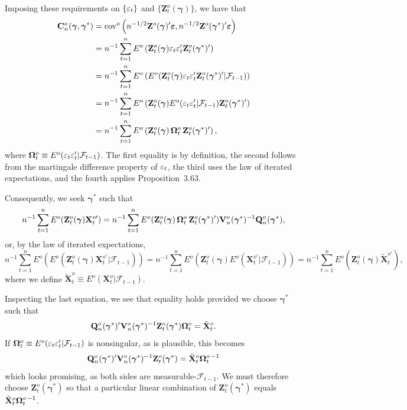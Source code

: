 Imposing these requirements on $\{\varepsilon_t\}$ and $\{\mathbf{Z}_t^o(\boldsymbol{\gamma})\}$, we have that
\begin{align*}
\mathbf{C}_n^o(\boldsymbol{\gamma}, \boldsymbol{\gamma}^*) &= \mathrm{cov}^o\left(n^{-1/2}\mathbf{Z}^o(\boldsymbol{\gamma})'\boldsymbol{\varepsilon}, n^{-1/2}\mathbf{Z}^o(\boldsymbol{\gamma}^*)'\boldsymbol{\varepsilon}\right) \\
&= n^{-1}\sum_{t=1}^{n}E^o\left(\mathbf{Z}_t^o(\boldsymbol{\gamma})\varepsilon_t\varepsilon_t'\mathbf{Z}_t^o(\boldsymbol{\gamma}^*)'\right) \\
&= n^{-1}\sum_{t=1}^{n}E^o\left(E^o(\mathbf{Z}_t^o(\boldsymbol{\gamma})\varepsilon_t\varepsilon_t'\mathbf{Z}_t^o(\boldsymbol{\gamma}^*)'|\mathcal{F}_{t-1})\right) \\
&= n^{-1}\sum_{t=1}^{n}E^o\left(\mathbf{Z}_t^o(\boldsymbol{\gamma})E^o(\varepsilon_t\varepsilon_t'|\mathcal{F}_{t-1})\mathbf{Z}_t^o(\boldsymbol{\gamma}^*)'\right) \\
&= n^{-1}\sum_{t=1}^{n}E^o\left(\mathbf{Z}_t^o(\boldsymbol{\gamma})\,\boldsymbol{\Omega}_t^o\,\mathbf{Z}_t^o(\boldsymbol{\gamma}^*)'\right),
\end{align*}
where $\boldsymbol{\Omega}_t^o \equiv E^o(\varepsilon_t\varepsilon_t'|\mathcal{F}_{t-1})$. The first equality is by definition, the second
follows from the martingale difference property of $\varepsilon_t$, the third uses the law
of iterated expectations, and the fourth applies Proposition~3.63.

Consequently, we seek $\boldsymbol{\gamma}^*$ such that
\[
n^{-1}\sum_{t=1}^{n}E^o(\mathbf{Z}_t^o(\boldsymbol{\gamma})\mathbf{X}_t^{o\prime}) = n^{-1}\sum_{t=1}^{n}E^o(\mathbf{Z}_t^o(\boldsymbol{\gamma})\,\boldsymbol{\Omega}_t^o\,\mathbf{Z}_t^o(\boldsymbol{\gamma}^*)')\mathbf{V}_n^o(\boldsymbol{\gamma}^*)^{-1}\mathbf{Q}_n^o(\boldsymbol{\gamma}^*),
\]
or, by the law of iterated expectations,
\[
n^{-1}\sum_{t=1}^{n}E^o\left(E^o\left(\mathbf{Z}_t^o(\boldsymbol{\gamma})\mathbf{X}_t^{o\prime}|\mathcal{F}_{t-1}\right)\right)
= n^{-1}\sum_{t=1}^{n}E^o\left(\mathbf{Z}_t^o(\boldsymbol{\gamma})E^o\left(\mathbf{X}_t^{o\prime}|\mathcal{F}_{t-1}\right)\right)
= n^{-1}\sum_{t=1}^{n}E^o\left(\mathbf{Z}_t^o(\boldsymbol{\gamma})\tilde{\mathbf{X}}_t^{o\prime}\right),
\]
where we define $\tilde{\mathbf{X}}_t^o \equiv E^o(\mathbf{X}_t^o|\mathcal{F}_{t-1})$.

Inspecting the last equation, we see that equality holds provided we
choose $\boldsymbol{\gamma}^*$ such that
\[
\mathbf{Q}_n^o(\boldsymbol{\gamma}^*)'\mathbf{V}_n^o(\boldsymbol{\gamma}^*)^{-1}\mathbf{Z}_t^o(\boldsymbol{\gamma}^*)\boldsymbol{\Omega}_t^o = \tilde{\mathbf{X}}_t^o.
\]
If $\boldsymbol{\Omega}_t^o \equiv E^o(\varepsilon_t\varepsilon_t'|\mathcal{F}_{t-1})$ is nonsingular, as is plausible, this becomes
\[
\mathbf{Q}_n^o(\boldsymbol{\gamma}^*)'\mathbf{V}_n^o(\boldsymbol{\gamma}^*)^{-1}\mathbf{Z}_t^o(\boldsymbol{\gamma}^*) = \tilde{\mathbf{X}}_t^o\boldsymbol{\Omega}_t^{o\,-1}
\]
which looks promising, as both sides are measurable-$\mathcal{F}_{t-1}$. We must therefore choose $\mathbf{Z}_t^o(\boldsymbol{\gamma}^*)$ so that a particular linear combination of $\mathbf{Z}_t^o(\boldsymbol{\gamma}^*)$ equals
$\tilde{\mathbf{X}}_t^o\boldsymbol{\Omega}_t^{o\,-1}$.

